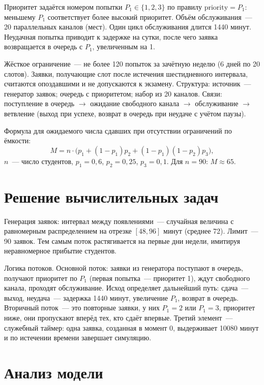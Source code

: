 \documentclass[a4paper, 14pt]{extarticle}
\begin{document}
Приоритет задаётся номером попытки $P_1 \in \{1, 2, 3\}$ по правилу $\text{priority} = P_1$: меньшему $P_1$ соответствует более высокий приоритет. Объём обслуживания~--- 20 параллельных каналов (мест). Один цикл обслуживания длится 1440 минут. Неудачная попытка приводит к задержке на сутки, после чего заявка возвращается в очередь с $P_1$, увеличенным на 1.

Жёсткое ограничение~--- не более 120 попыток за зачётную неделю (6 дней по 20 слотов). Заявки, получающие слот после истечения шестидневного интервала, считаются опоздавшими и не допускаются к экзамену. Структура: источник~--- генератор заявок; очередь с приоритетом; набор из 20 каналов. Связи: поступление в очередь $\to$ ожидание свободного канала $\to$ обслуживание $\to$ ветвление (выход при успехе, возврат в очередь при неудаче с учётом паузы).

Формула для ожидаемого числа сдавших при отсутствии ограничений по ёмкости:
\begin{equation}
M = n \cdot \bigl( p_1 + (1-p_1) p_2 + (1-p_1)(1-p_2) p_3 \bigr),
\end{equation}
$n$~--- число студентов, $p_1 = 0{,}6$, $p_2 = 0{,}25$, $p_3 = 0{,}1$. Для $n = 90$: $M \approx 65$.

\section{Решение вычислительных задач}

Генерация заявок: интервал между появлениями~--- случайная величина с равномерным распределением на отрезке $[48, 96]$ минут (среднее 72). Лимит~--- 90 заявок. Тем самым поток растягивается на первые дни недели, имитируя неравномерное прибытие студентов.

Логика потоков. Основной поток: заявки из генератора поступают в очередь, получают приоритет по $P_1$ (первая попытка~--- приоритет 1), ждут свободного канала, проходят обслуживание. Исход определяет дальнейший путь: сдача~--- выход, неудача~--- задержка 1440 минут, увеличение $P_1$, возврат в очередь. Вторичный поток~--- это повторные заявки, у них $P_1 = 2$ или $P_1 = 3$, приоритет ниже, они пропускают вперёд тех, кто сдаёт впервые. Третий элемент~--- служебный таймер: одна заявка, созданная в момент 0, выдерживает 10080 минут и по истечении времени завершает симуляцию.

\section{Анализ модели}
\end{document}
